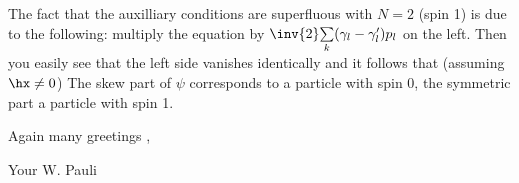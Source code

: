 The fact that the auxilliary conditions are superfluous with $N=2$ (spin 1) is due to the following: multiply the equation
by $\inv{2}\sumX{k}(\gamma_l - \gamma'_l)p_l$ on the left. Then you easily see that the left side vanishes identically and it follows that (assuming $\hx \neq 0$)
The skew part of $\psi$ corresponds to a particle with spin 0, the symmetric part a particle with spin 1.

Again many greetings ,

Your W. Pauli
